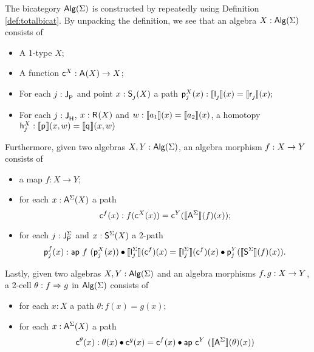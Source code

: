 The bicategory $\algM(\sign)$ is constructed by repeatedly using Definition \ref{def:totalbicat}.
By unpacking the definition, we see that an algebra $X : \algM(\sign)$ consists of
\begin{itemize}
	\item A 1-type $X$;
	\item A function $\AlgPoint{X} : \polyAct{\pointconstr}{X} \rightarrow X$;
	\item For each $j : \pathlabel$ and point $x : \polyAct{\patharg_j}{X}$ a path
	$
	\AlgPath{X}{j}(x) : \semE{\pathleft_j}(x) = \semE{\pathright_j}(x);
	$
	\item For each $j : \homotlabel$, $x : \polyAct{\homotpointarg}{X}$ and $w : \semE{a_1}(x) = \semE{a_2}(x)$, a homotopy
	$
	\AlgHomot{X}{j} : \semH{\homotleft}(x, w) = \semH{\homotright}(x, w)
	$
\end{itemize}
Furthermore, given two algebras  $X, Y : \algM(\sign)$, an algebra morphism $f : X \onecell Y$ consists of
\begin{itemize}
	\item a map $f : X \rightarrow Y$;
	\item for each $x : \polyAct{\pointconstr[\sign]}{X}$ a path
	\[
	\AlgMapPoint{f}(x) : f(\AlgPoint{X}(x)) = \AlgPoint{Y}(\semP{\pointconstr[\sign]}(f)(x));
	\]
	\item for each $j : \pathlabel[\sign]$ and $x : \polyAct{\patharg[\sign]}{X}$ a 2-path
	\[
	\AlgMapPath{f}{j}(x) :
	\ap{f}{(\AlgPath{X}{j}(x))} \vcomp \semE{\pathleft[\sign]_j}(\AlgMapPoint{f})(x)
	=
	\semE{\pathleft[\sign]_j}(\AlgMapPoint{f})(x) \vcomp \AlgPath{Y}{j}(\semP{\patharg[\sign]}(f)(x)).
	\]
\end{itemize}
Lastly, given two algebras $X, Y : \algM(\sign)$ and an algebra morphisms $f, g : X \onecell Y$, a 2-cell $\theta : f \twocell g$ in $\algM(\sign)$ consists of
\begin{itemize}
	\item for each $x : X$ a path $\theta : f(x) = g(x)$;
	\item for each $x : \polyAct{\pointconstr[\sign]}{X}$ a path
	\[
	\AlgCellPoint{\theta}(x) : 
	\theta(x) \vcomp \AlgMapPoint{g}(x)
	=
	\AlgMapPoint{f}(x)
	\vcomp
	\ap{\AlgPoint{Y}}{(\semP{\pointconstr[\sign]}(\theta)(x))}
	\]
\end{itemize}
